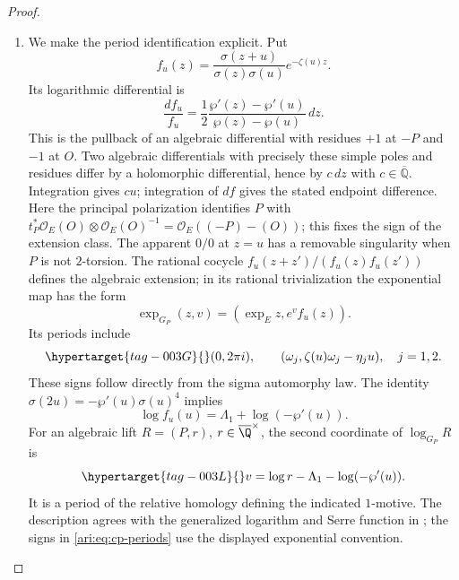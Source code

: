 \begin{proof}
\begin{enumerate}[label=\arabic*.,leftmargin=*]
\item We make the period identification explicit. Put
\[
 f_u(z)=\frac{\sigma(z+u)}{\sigma(z)\sigma(u)}e^{-\zeta(u)z}.
\]
Its logarithmic differential is
\[
 \frac{df_u}{f_u}
 =\frac12\frac{\wp'(z)-\wp'(u)}{\wp(z)-\wp(u)}\,dz.
\]
This is the pullback of an algebraic differential with residues
$+1$ at $-P$ and $-1$ at $O$.
Two algebraic differentials with precisely these simple poles
and residues differ by a holomorphic differential, hence by
$c\,dz$ with $c\in\overline{\mathbb Q}$.
Integration gives $cu$; integration of $df$ gives the stated
endpoint difference.
Here the principal polarization identifies $P$ with
$t_P^*\mathcal O_E(O)\otimes\mathcal O_E(O)^{-1}
=\mathcal O_E((-P)-(O))$; this fixes the sign of the extension class. The apparent $0/0$ at $z=u$
has a removable singularity when $P$ is not $2$-torsion.
The rational cocycle $f_u(z+z')/(f_u(z)f_u(z'))$ defines
the algebraic extension; in its rational trivialization the
exponential map has the form
\[
 \exp_{G_P}(z,v)=(\exp_E z,e^v f_u(z)).
\]
Its periods include
\begin{equation}\hypertarget{tag-003G}{}\label{ari:eq:cp-periods}
 (0,2\pi i),\qquad
 (\omega_j,\zeta(u)\omega_j-\eta_j u),\quad j=1,2.
\end{equation}
These signs follow directly from the sigma automorphy law.
The identity
$\sigma(2u)=-\wp'(u)\sigma(u)^4$ implies
\[
 \log f_u(u)=\Lambda_1+\log(-\wp'(u)).
\]
For an algebraic lift $R=(P,r)$, $r\in\overline\Q^{\times}$,
the second coordinate of $\log_{G_P}R$ is
\begin{equation}\hypertarget{tag-003L}{}\label{ari:eq:cp-v}
 v=\log r-\Lambda_1-\log(-\wp'(u)).
\end{equation}
It is a period of the relative homology defining the indicated
$1$-motive.
The description agrees with the generalized logarithm and
Serre function in \citet[Section~2.3, equations~(2.10)--(2.13), pp.~7--8;
Definitions~2.3--2.4, p.~8; Section~6.1, pp.~26--27,
arXiv v2]{bertolin2022}; the signs in
\eqref{ari:eq:cp-periods} use the displayed exponential convention.
\end{enumerate}
\end{proof}